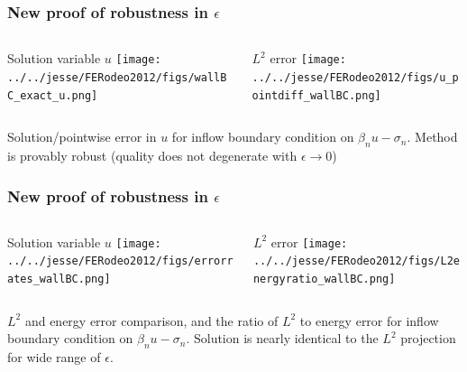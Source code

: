 \documentclass[mathserif]{beamer}
\begin{document}
\begin{frame}
\frametitle{New proof of robustness in $\epsilon$}

\begin{columns}[c]
\begin{column}{5.5cm}
\begin{block}{Solution variable $u$}
\texttt{[image: ../../jesse/FERodeo2012/figs/wallBC\_exact\_u.png]}
\end{block}
\end{column}
\begin{column}{5.4cm}
\begin{block}{$L^2$ error}
\texttt{[image: ../../jesse/FERodeo2012/figs/u\_pointdiff\_wallBC.png]}
\end{block}
\end{column}
\end{columns}
\vspace{3 mm}

Solution/pointwise error in $u$ for inflow boundary condition on $\beta_n u - \sigma_n$.  Method is provably robust (quality does not degenerate with $\epsilon \rightarrow 0$)

\end{frame}

\begin{frame}
\frametitle{New proof of robustness in $\epsilon$}

\begin{columns}[c]
\begin{column}{5.5cm}
\begin{block}{Solution variable $u$}
\texttt{[image: ../../jesse/FERodeo2012/figs/errorrates\_wallBC.png]}
\end{block}
\end{column}
\begin{column}{5.4cm}
\begin{block}{$L^2$ error}
\texttt{[image: ../../jesse/FERodeo2012/figs/L2energyratio\_wallBC.png]}
\end{block}
\end{column}
\end{columns}
\vspace{3 mm}

$L^2$ and energy error comparison, and the ratio of $L^2$ to energy error for inflow boundary condition on $\beta_n u - \sigma_n$.  Solution is nearly identical to the $L^2$ projection for wide range of $\epsilon$. 

\end{frame}
\end{document}
